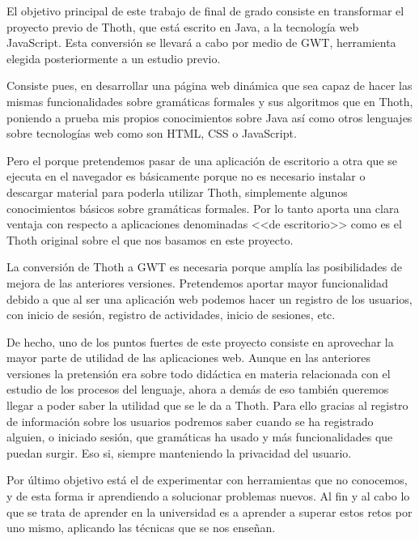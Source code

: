 
El objetivo principal de este trabajo de final de grado consiste en transformar el proyecto previo de Thoth, que está escrito en Java, a la tecnología web JavaScript. Esta conversión se llevará a cabo por medio de GWT, herramienta elegida posteriormente a un estudio previo. 

Consiste pues, en desarrollar una página web dinámica que sea capaz de hacer las mismas funcionalidades sobre gramáticas formales y sus algoritmos que en Thoth, poniendo a prueba mis propios conocimientos sobre Java así como otros lenguajes sobre tecnologías web como son HTML, CSS o JavaScript.

Pero el porque pretendemos pasar de una aplicación de escritorio a otra que se ejecuta en el navegador es básicamente porque no es necesario instalar o descargar material para poderla utilizar Thoth, simplemente algunos conocimientos básicos sobre gramáticas formales. Por lo tanto aporta una clara ventaja con respecto a aplicaciones denominadas <<de escritorio>> como es el Thoth original sobre el que nos basamos en este proyecto.

La conversión de Thoth a GWT es necesaria porque amplía las posibilidades de mejora de las anteriores versiones. Pretendemos aportar mayor funcionalidad debido a que al ser una aplicación web podemos hacer un registro de los usuarios, con inicio de sesión, registro de actividades, inicio de sesiones, etc. 

De hecho, uno de los puntos fuertes de este proyecto consiste en aprovechar la mayor parte de utilidad de las aplicaciones web. Aunque en las anteriores versiones la pretensión era sobre todo didáctica en materia relacionada con el estudio de los procesos del lenguaje, ahora a demás de eso también queremos llegar a poder saber la utilidad que se le da a Thoth. Para ello gracias al registro de información sobre los usuarios podremos saber cuando se ha registrado alguien, o iniciado sesión, que gramáticas ha usado y más funcionalidades que puedan surgir. Eso si, siempre manteniendo la privacidad del usuario.

Por último objetivo está el de experimentar con herramientas que no conocemos, y de esta forma ir aprendiendo a solucionar problemas nuevos. Al fin y al cabo lo que se trata de aprender en la universidad es a aprender a superar estos retos por uno mismo, aplicando las técnicas que se nos enseñan.